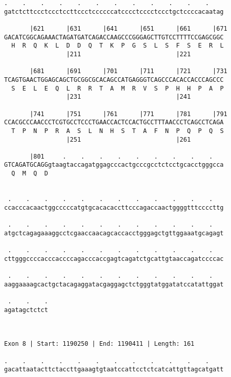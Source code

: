 \documentclass{article}
\begin{document}
\begin{Verbatim}
.    .    .    .    .    .    .    .    .    .    .    .    
gatctcttccctccctccttccctccccccatcccctcccctccctgctccccacaatag
                                                            
       |621      |631      |641      |651      |661      |671
GACATCGGCAGAAACTAGATGATCAGACCAAGCCCGGGAGCTTGTCCTTTTCCGAGCGGC
  H  R  Q  K  L  D  D  Q  T  K  P  G  S  L  S  F  S  E  R  L
                 |211                          |221         
  
       |681      |691      |701      |711      |721      |731
TCAGTGAACTGGAGCAGCTGCGGCGCACAGCCATGAGGGTCAGCCCACACCACCCAGCCC
  S  E  L  E  Q  L  R  R  T  A  M  R  V  S  P  H  H  P  A  P
                 |231                          |241         
  
       |741      |751      |761      |771      |781      |791
CCACGCCCAACCCTCGTGCCTCCCTGAACCACTCCACTGCCTTTAACCCTCAGCCTCAGA
  T  P  N  P  R  A  S  L  N  H  S  T  A  F  N  P  Q  P  Q  S
                 |251                          |261         
  
       |801     .    .    .    .    .    .    .    .    .   
GTCAGATGCAGGgtaagtaccagatggagcccactgcccgcctctcctgcacctgggcca
  Q  M  Q  D                                                
                                                            
  
 .    .    .    .    .    .    .    .    .    .    .    .   
ccacccacaactggcccccatgtgcacacaccttcccagaccaactggggtttccccttg
                                                            
 .    .    .    .    .    .    .    .    .    .    .    .   
atgctcagagaaaggcctcgaaccaacagcaccacctgggagctgttggaaatgcagagt
                                                            
 .    .    .    .    .    .    .    .    .    .    .    .   
cttgggccccacccaccccagacccaccgagtcagatctgcattgtaaccagatccccac
                                                            
 .    .    .    .    .    .    .    .    .    .    .    .   
aaggaaaagcactgctacagaggatacgaggagctctgggtatggatatccatattggat
                                                            
 .    .    .
agatagctctct
            
            
 
Exon 8 | Start: 1190250 | End: 1190411 | Length: 161
 
.    .    .    .    .    .    .    .    .    .    .    .    
gacattaatacttctaccttgaaagtgtaatccattcctctcatcattgttagcatgatt
                                                            

\end{Verbatim}
\end{document}
